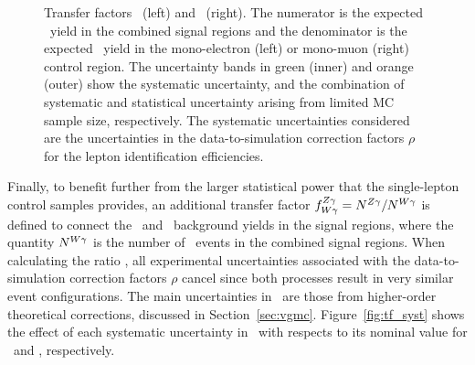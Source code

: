 \begin{figure}[htbp]
{  }
  \caption{
    Transfer factors \RWe\ (left) and \RWm\ (right).
    The numerator is the expected \wlng\ yield in the combined signal regions and the denominator is the expected \wlng\ yield in the mono-electron (left) or mono-muon (right) control region.
    The uncertainty bands in green (inner) and orange (outer) show the systematic uncertainty, and the combination of systematic and statistical uncertainty arising from limited MC sample size, respectively. 
    The systematic uncertainties considered are the uncertainties in the data-to-simulation correction factors $\rho$ for the lepton identification efficiencies.
  }
  \label{fig:tf_w}
\end{figure}

Finally, to benefit further from the larger statistical power that the single-lepton control samples provides, an additional transfer factor $f^{{Z}\gamma}_{{W}\gamma} = N^{{Z}\gamma}_{} / N^{{W}\gamma}_{}$ is defined to connect the \zinvg\ and \wlng\ background yields in the signal regions, where the quantity $N^{{W}\gamma}_{}$ is the number of \wlng\ events in the combined signal regions. 
When calculating the ratio \fZW, all experimental uncertainties associated with the data-to-simulation correction factors $\rho$ cancel since both processes result in very similar event configurations. 
The main uncertainties in \fZW\ are those from higher-order theoretical corrections, discussed in Section~\ref{sec:vgmc}.
Figure~\ref{fig:tf_syst} shows the effect of each systematic uncertainty in \fZW\ with respects to its nominal value for \zinvg\ and \wlng, respectively.

